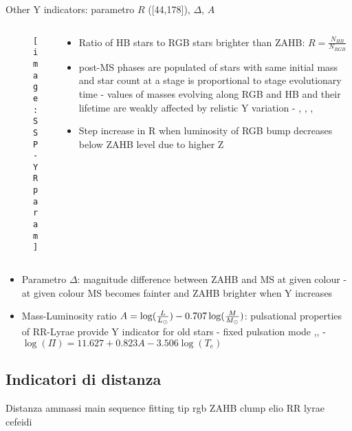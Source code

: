 \begin{frame}{Other Y indicators: parametro $R$ ([44,178]), $\Delta$, $A$}
\begin{columns}[T]
	\begin{column}{0.5\textwidth}
		\begin{figure}[!ht]
			\texttt{[image: SSP-YRparam]}\label{fig:SSP-YRparam}
		\end{figure}
	\end{column}
	\begin{column}{0.5\textwidth}
		\begin{itemize}
			\item Ratio of HB stars to RGB stars brighter than ZAHB:  $R=\frac{N_{HB}}{N_{RGB}}$
			\item post-MS phases are populated of stars with same initial mass and star count at a stage is proportional to stage evolutionary time - values of masses evolving along RGB and HB and their lifetime are weakly affected by relistic Y variation - , , , 
			\item Step increase in R when luminosity of RGB bump decreases below ZAHB level due to higher Z
		\end{itemize}
	\end{column}
\end{columns}
\begin{itemize}
\item Parametro $\Delta$: magnitude difference between ZAHB and MS at given colour - at given colour MS becomes fainter and ZAHB brighter when Y increases
\item Mass-Luminosity ratio $A=\log(\frac{L}{L_{\odot}})-0.707\log(\frac{M}{M_{\odot}})$: pulsational properties of RR-Lyrae provide Y indicator for old stars - fixed pulsation mode ,, - $\log(\Pi)=11.627+0.823A-3.506\log(T_e)$
\end{itemize}
\end{frame}

\subsection{Indicatori di distanza}

\begin{frame}{Distanza ammassi}
main sequence fitting
tip rgb
ZAHB
clump elio
RR lyrae
cefeidi
\end{frame}

